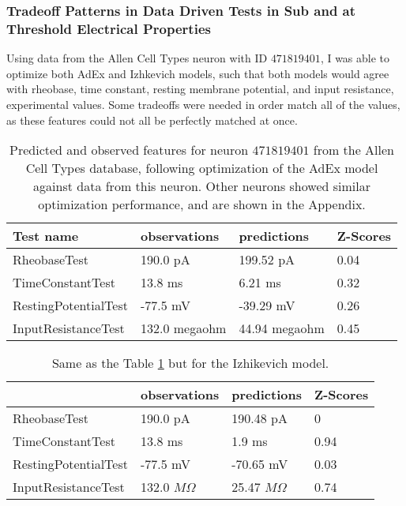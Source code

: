 \subsubsection{Tradeoff Patterns in Data Driven  Tests in Sub and at Threshold Electrical Properties}
\label{sec:rh_incomp}
Using data from the Allen Cell Types neuron with ID $471819401$,
I was able to optimize both AdEx and Izhkevich models, such that both models would agree with rheobase, time constant, resting membrane potential, and input resistance, experimental values. Some tradeoffs were needed in order match all of the values, as these features could not all be perfectly matched at once.
\begin{table}
\begin{center}
\begin{tabular}{|l|l|l|l|}
\toprule
Test name &   observations &    predictions & Z-Scores \\
\midrule
RheobaseTest         &       190.0 pA &      199.52 pA &     0.04 \\
TimeConstantTest     &        13.8 ms &        6.21 ms &     0.32 \\
RestingPotentialTest &       -77.5 mV &      -39.29 mV &     0.26 \\
InputResistanceTest  &  132.0 megaohm &  44.94 megaohm &     0.45 \\
\bottomrule
\end{tabular}
\caption[AdEx model fit quality]{Predicted and observed features for neuron $471819401$ from the Allen Cell Types database, following optimization of the AdEx model against data from this neuron.
Other neurons showed similar optimization performance, and are shown in the Appendix.}
\label{tab:adex-allen}
\end{center}
\end{table}

\begin{table}
\begin{center}
\begin{tabular}{|l|l|l|l|}
\toprule
{} &   observations &    predictions & Z-Scores \\
\midrule
RheobaseTest         &       190.0 pA &      190.48 pA &        0 \\
TimeConstantTest     &        13.8 ms &         1.9 ms &     0.94 \\
RestingPotentialTest &       -77.5 mV &      -70.65 mV &     0.03 \\
InputResistanceTest  &  132.0 $M\Omega$ &  25.47 $M\Omega$ &     0.74 \\
\bottomrule
\end{tabular}
\caption[AdEx model fit quality]{Same as the Table \ref{tab:adex-allen} but for the Izhikevich model.}
\label{tab:izhikevich-allen}
\end{center}
\end{table}

